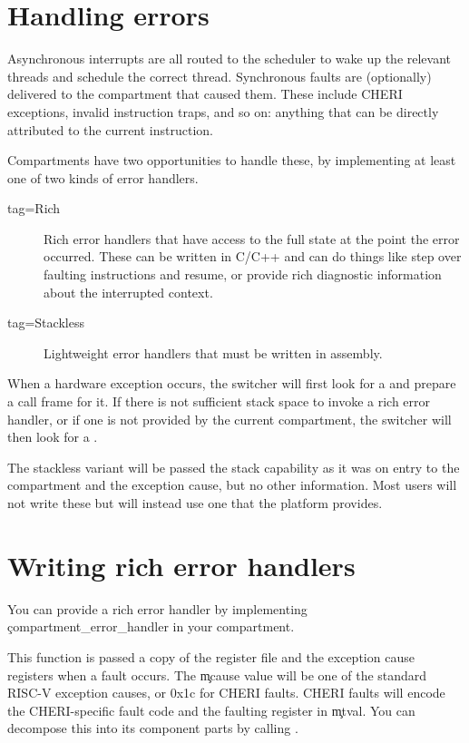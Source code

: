 \section[label=handling_errors]{Handling errors}

Asynchronous interrupts are all routed to the scheduler to wake up the relevant threads and schedule the correct thread.
Synchronous faults are (optionally) delivered to the compartment that caused them.
These include CHERI exceptions, invalid instruction traps, and so on: anything that can be directly attributed to the current instruction.

Compartments have two opportunities to handle these, by implementing at least one of two kinds of error handlers.

\begin{description}
	\item[tag=Rich]{Rich error handlers that have access to the full state at the point the error occurred.
		These can be written in C/C++ and can do things like step over faulting instructions and resume, or provide rich diagnostic information about the interrupted context.}
	\item[tag=Stackless]{Lightweight error handlers that must be written in assembly.}
\end{description}

When a hardware exception occurs, the switcher will first look for a  and prepare a call frame for it.
If there is not sufficient stack space to invoke a rich error handler, or if one is not provided by the current compartment, the switcher will then look for a .

The stackless variant will be passed the stack capability as it was on entry to the compartment and the exception cause, but no other information.
Most users will not write these but will instead use one that the platform provides.

\section{Writing rich error handlers}

You can provide a rich error handler by implementing \c{compartment_error_handler} in your compartment.


This function is passed a copy of the register file and the exception cause registers when a fault occurs.
The \c{mcause} value will be one of the standard RISC-V exception causes, or 0x1c for CHERI faults.
CHERI faults will encode the CHERI-specific fault code and the faulting register in \c{mtval}.
You can decompose this into its component parts by calling .

